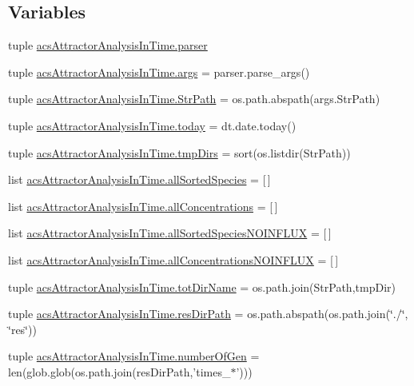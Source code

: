 \subsection*{Variables}
\begin{DoxyCompactItemize}
\item 
tuple \hyperlink{a00123_abed547533f84e18ca5b4c4a2cfaef63a}{acs\-Attractor\-Analysis\-In\-Time.\-parser}
\item 
tuple \hyperlink{a00123_ab6621347b1ac2fe0e436bd2f384af8dc}{acs\-Attractor\-Analysis\-In\-Time.\-args} = parser.\-parse\-\_\-args()
\item 
tuple \hyperlink{a00123_a1d168f4d444ea1d02f186a7568344fba}{acs\-Attractor\-Analysis\-In\-Time.\-Str\-Path} = os.\-path.\-abspath(args.\-Str\-Path)
\item 
tuple \hyperlink{a00123_af30cd903eabfe4c9167f2a5d0062a4ce}{acs\-Attractor\-Analysis\-In\-Time.\-today} = dt.\-date.\-today()
\item 
tuple \hyperlink{a00123_a4f312756a4e405be853b0a84be7e2e54}{acs\-Attractor\-Analysis\-In\-Time.\-tmp\-Dirs} = sort(os.\-listdir(Str\-Path))
\item 
list \hyperlink{a00123_aceddba8afb0eb0cc7ba102491a9a3c30}{acs\-Attractor\-Analysis\-In\-Time.\-all\-Sorted\-Species} = \mbox{[}$\,$\mbox{]}
\item 
list \hyperlink{a00123_a8c439282d32e80d2e2d4c02cc36f1101}{acs\-Attractor\-Analysis\-In\-Time.\-all\-Concentrations} = \mbox{[}$\,$\mbox{]}
\item 
list \hyperlink{a00123_a48013e92108a94a85d1e32c2397eb37c}{acs\-Attractor\-Analysis\-In\-Time.\-all\-Sorted\-Species\-N\-O\-I\-N\-F\-L\-U\-X} = \mbox{[}$\,$\mbox{]}
\item 
list \hyperlink{a00123_af6dd7a5a396717328c091d96d629af7c}{acs\-Attractor\-Analysis\-In\-Time.\-all\-Concentrations\-N\-O\-I\-N\-F\-L\-U\-X} = \mbox{[}$\,$\mbox{]}
\item 
tuple \hyperlink{a00123_aeed4ca0c266fb5e31aebbbbe2f389378}{acs\-Attractor\-Analysis\-In\-Time.\-tot\-Dir\-Name} = os.\-path.\-join(Str\-Path,tmp\-Dir)
\item 
tuple \hyperlink{a00123_a28ca19f0f566396ef664e068a41a2837}{acs\-Attractor\-Analysis\-In\-Time.\-res\-Dir\-Path} = os.\-path.\-abspath(os.\-path.\-join(\char`\"{}./\char`\"{}, \char`\"{}res\char`\"{}))
\item 
tuple \hyperlink{a00123_a28cc280ff54c726bd790cf781d3bab8c}{acs\-Attractor\-Analysis\-In\-Time.\-number\-Of\-Gen} = len(glob.\-glob(os.\-path.\-join(res\-Dir\-Path,'times\-\_\-$\ast$')))

\end{DoxyCompactItemize}
